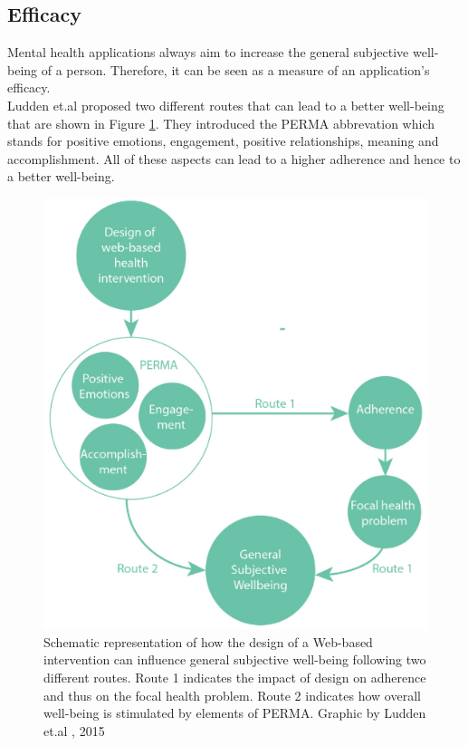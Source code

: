 \documentclass[sigconf, nonacm]{acmart}
\begin{document}
\subsection{Efficacy}
\label{sec:three_two}
Mental health applications always aim to increase the general subjective well-being of a person. Therefore, it can be seen as a measure of an application's efficacy.
\\    
Ludden et.al \cite{Ludden2015} proposed two different routes that can lead to a better well-being that are shown in Figure \ref{fig:routes}. They introduced the PERMA abbrevation which stands for positive emotions, engagement, positive relationships, meaning and accomplishment. All of these aspects can lead to a higher adherence and hence to a better well-being.
\\
\begin{figure}[h]
  \centering
  \includegraphics[width=\linewidth]{routes}
  \caption{Schematic representation of how the design of a Web-based intervention can influence general subjective well-being following two different routes. Route 1 indicates the impact of design on adherence and thus on the focal health problem. Route 2 indicates how overall well-being is stimulated by elements of PERMA. Graphic by Ludden et.al \cite{Ludden2015}, 2015}
  \label{fig:routes}
\end{figure}
\end{document}
